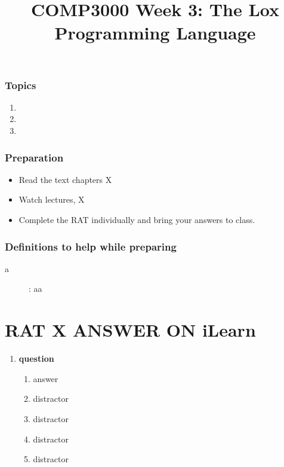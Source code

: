 \documentclass[twoside=false, DIV=14]{scrartcl}
\title{\color{redish} \vspace{-1em}COMP3000 Week 3: The Lox Programming Language}
\begin{document}
{\color{blackish}\maketitle}\vspace{-7em}

\begin{abstract}
\end{abstract}

\section*{Topics}
\begin{enumerate}
\item
\item
\item
\end{enumerate}

\section*{Preparation}
\begin{itemize}
\item Read the text chapters X
\item Watch lectures, X
\item Complete the RAT individually and bring your answers to class.
\end{itemize}

\section*{Definitions to help while preparing}
\begin{description}
\item[a]: aa
\end{description}

\newpage
\part*{RAT X \hspace{6em} {\small ANSWER ON iLearn}}
\renewcommand{\labelenumii}{\alph{enumii}) $\square$}
\begin{enumerate}
\item \textbf{question}
\begin{enumerate}
  \item answer \tick
  \item distractor
  \item distractor
  \item distractor
  \item distractor
\end{enumerate}

\end{enumerate}
\end{document}
